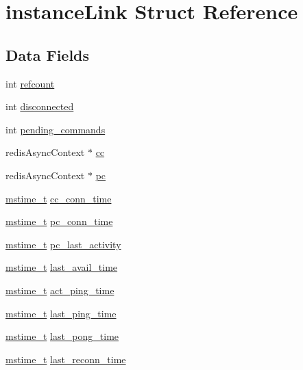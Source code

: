 \hypertarget{structinstance_link}{}\section{instance\+Link Struct Reference}
\label{structinstance_link}
\subsection*{Data Fields}
\begin{DoxyCompactItemize}
\item 
int \hyperlink{structinstance_link_a6022c8a609170c7365fb96e83cb2df48}{refcount}
\item 
int \hyperlink{structinstance_link_a6f03dfc777300fd0dc9acebf4822249c}{disconnected}
\item 
int \hyperlink{structinstance_link_acc254a996c1faea659a20feb073d4f00}{pending\+\_\+commands}
\item 
redis\+Async\+Context $\ast$ \hyperlink{structinstance_link_a403cc1bb3650a1a12adb31b9d8c8f016}{cc}
\item 
redis\+Async\+Context $\ast$ \hyperlink{structinstance_link_afe761f1776d1b45b7abadf158f8bbe37}{pc}
\item 
\hyperlink{redismodule_8h_a652ae61e2475bc8957454534544968fc}{mstime\+\_\+t} \hyperlink{structinstance_link_a488300e93393a2d8d6377bb4d46ad104}{cc\+\_\+conn\+\_\+time}
\item 
\hyperlink{redismodule_8h_a652ae61e2475bc8957454534544968fc}{mstime\+\_\+t} \hyperlink{structinstance_link_a12befcf62811f417eaf23da1076547bc}{pc\+\_\+conn\+\_\+time}
\item 
\hyperlink{redismodule_8h_a652ae61e2475bc8957454534544968fc}{mstime\+\_\+t} \hyperlink{structinstance_link_ad3256ba26a4f06b5cc89221c2d6bf0a6}{pc\+\_\+last\+\_\+activity}
\item 
\hyperlink{redismodule_8h_a652ae61e2475bc8957454534544968fc}{mstime\+\_\+t} \hyperlink{structinstance_link_a74938a205871007ed9a784e48aaa52f1}{last\+\_\+avail\+\_\+time}
\item 
\hyperlink{redismodule_8h_a652ae61e2475bc8957454534544968fc}{mstime\+\_\+t} \hyperlink{structinstance_link_a96b7748c7ea4249b266bfa7417bcec1d}{act\+\_\+ping\+\_\+time}
\item 
\hyperlink{redismodule_8h_a652ae61e2475bc8957454534544968fc}{mstime\+\_\+t} \hyperlink{structinstance_link_a3f2e6f68ee92867d1b8a248050f83cf1}{last\+\_\+ping\+\_\+time}
\item 
\hyperlink{redismodule_8h_a652ae61e2475bc8957454534544968fc}{mstime\+\_\+t} \hyperlink{structinstance_link_a1f03922d605d4284100bb2abdeb6800b}{last\+\_\+pong\+\_\+time}
\item 
\hyperlink{redismodule_8h_a652ae61e2475bc8957454534544968fc}{mstime\+\_\+t} \hyperlink{structinstance_link_ab333e48e13c659a387c659e1bc4e02e1}{last\+\_\+reconn\+\_\+time}
\end{DoxyCompactItemize}


